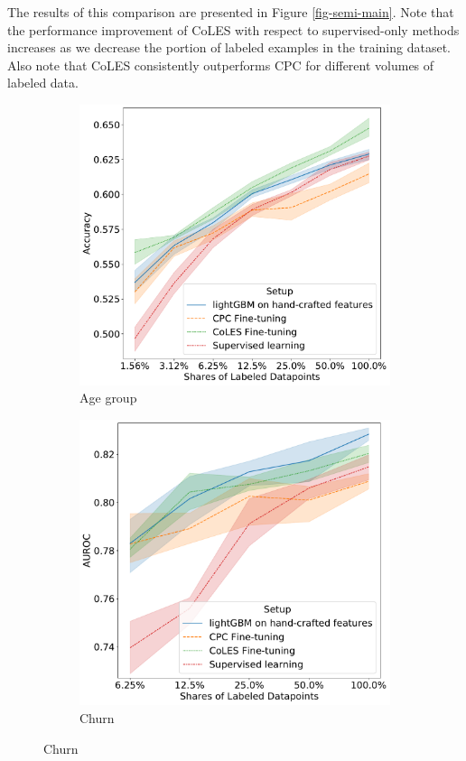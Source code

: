 \documentclass[sigconf, anonymous]{acmart}
\begin{document}
The results of this comparison are presented in Figure \ref{fig-semi-main}. Note that the performance improvement of CoLES with respect to supervised-only methods increases as we decrease the portion of labeled examples in the training dataset. Also note that CoLES consistently outperforms CPC for different volumes of labeled data.

\begin{figure}
  \centering
  \begin{subfigure}{0.25\linewidth}
    \caption{Age group}
    \includegraphics[width=\linewidth]{figures/ss_age_pred_per.pdf}
  \end{subfigure}%
  \begin{subfigure}{0.25\linewidth}
    \caption{Churn}
    \includegraphics[width=\linewidth]{figures/ss_rosbank_per.pdf}

\end{subfigure}
\end{figure}
\end{document}
